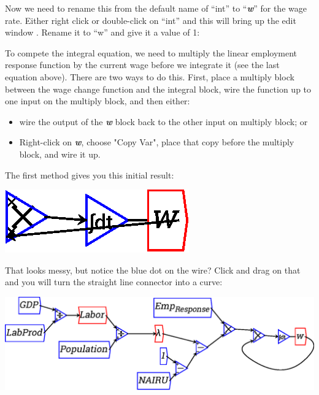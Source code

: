 Now we need to rename this from the default name of ``int'' to
``{\em\bf w}'' for the wage rate. Either right click or double-click
on ``int'' and this will bring up the edit window . Rename it to ``w'' and
give it a value of 1: 

\begin{center}
\end{center}

To compete the integral equation, we need to multiply the linear
employment response function by the current wage before we integrate
it (see the last equation above). There are two ways to do
this. First, place a multiply block between the wage change function
and the integral block, wire the function up to one input on the
multiply block, and then either:

\begin{itemize}
\item wire the output of the {\bf\em w} block back to the other input
on multiply block; or
\item Right-click on {\bf\em w}, choose "Copy Var", place that copy
before the multiply block, and wire it up.
\end{itemize}

The first method gives you this initial result:

\begin{center}
\includegraphics{images/NewItem110.eps}
\end{center}

That looks messy, but notice the blue dot on the wire? Click and drag
on that and you will turn the straight line connector into a curve: 

\begin{center}
\includegraphics{images/NewItem111.eps}
\end{center}

